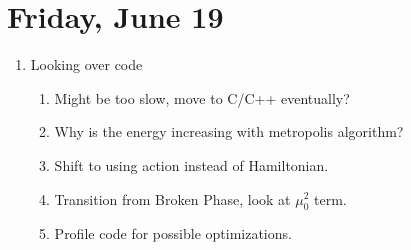 \documentclass[english]{article}
\begin{document}
\section{Friday, June 19}
    \begin{enumerate}
        \item Looking over code
        \begin{enumerate}
            \item Might be too slow, move to C/C++ eventually?
            \item Why is the energy increasing with metropolis algorithm?
            \item Shift to using action instead of Hamiltonian.
            \item Transition from Broken Phase, look at $\mu_0^2$ term.
            \item Profile code for possible optimizations.
        \end{enumerate}
    \end{enumerate}

\nocite{*}


\end{document}
